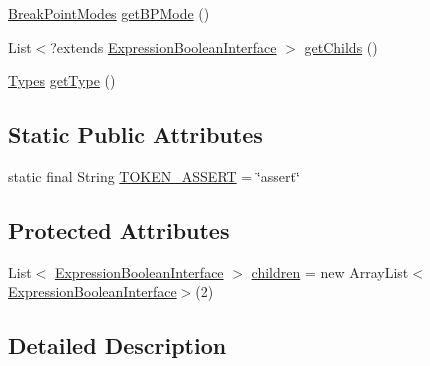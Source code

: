 \begin{DoxyCompactItemize}
\item 
\hyperlink{enumgov_1_1nasa_1_1jpf_1_1inspector_1_1server_1_1breakpoints_1_1_break_point_modes}{Break\+Point\+Modes} \hyperlink{classgov_1_1nasa_1_1jpf_1_1inspector_1_1server_1_1expression_1_1_expression_boolean_binary_operator_a7ef59a2108ddded0cc7094ae1e3086d7}{get\+B\+P\+Mode} ()
\item 
List$<$?extends \hyperlink{interfacegov_1_1nasa_1_1jpf_1_1inspector_1_1server_1_1expression_1_1_expression_boolean_interface}{Expression\+Boolean\+Interface} $>$ \hyperlink{classgov_1_1nasa_1_1jpf_1_1inspector_1_1server_1_1expression_1_1_expression_boolean_binary_operator_a8cf5fe32bcd0cd345799ea65905beac3}{get\+Childs} ()
\item 
\hyperlink{enumgov_1_1nasa_1_1jpf_1_1inspector_1_1server_1_1expression_1_1_types}{Types} \hyperlink{classgov_1_1nasa_1_1jpf_1_1inspector_1_1server_1_1expression_1_1_expression_boolean_aed010ff8683eb1e8621e226703133457}{get\+Type} ()
\end{DoxyCompactItemize}
\subsection*{Static Public Attributes}
\begin{DoxyCompactItemize}
\item 
static final String \hyperlink{classgov_1_1nasa_1_1jpf_1_1inspector_1_1server_1_1expression_1_1expressions_1_1_expression_breakpoint_assert_a39799eee97d0ac5b0f8e8140b5699551}{T\+O\+K\+E\+N\+\_\+\+A\+S\+S\+E\+RT} = \char`\"{}assert\char`\"{}
\end{DoxyCompactItemize}
\subsection*{Protected Attributes}
\begin{DoxyCompactItemize}
\item 
List$<$ \hyperlink{interfacegov_1_1nasa_1_1jpf_1_1inspector_1_1server_1_1expression_1_1_expression_boolean_interface}{Expression\+Boolean\+Interface} $>$ \hyperlink{classgov_1_1nasa_1_1jpf_1_1inspector_1_1server_1_1expression_1_1_expression_boolean_binary_operator_aa51f2a94e4b46898cc588a25f3957f6f}{children} = new Array\+List$<$\hyperlink{interfacegov_1_1nasa_1_1jpf_1_1inspector_1_1server_1_1expression_1_1_expression_boolean_interface}{Expression\+Boolean\+Interface}$>$(2)
\end{DoxyCompactItemize}


\subsection{Detailed Description}


